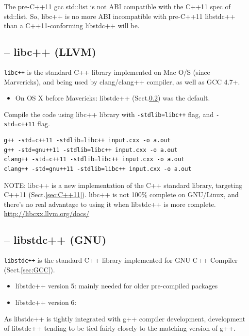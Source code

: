 The pre-C++11 gcc std::list is not ABI compatible with the C++11 spec of
std::list. So, libc++ is no more ABI incompatible
with pre-C++11 libstdc++ than a C++11-conforming libstdc++ will be.


\subsection{-- libc++ (LLVM)}
\label{sec:libc++}

\verb!libc++! is the standard C++ library implemented on Mac O/S (since
Marvericks), and being used by clang/clang++ compiler, as well as GCC 4.7+.
\begin{itemize}
  \item On OS X before Mavericks: libstdc++ (Sect.\ref{sec:libstdc++}) was the
  default.
\end{itemize}
Compile the code using libc++ library with \verb!-stdlib=libc++! flag, and 
\verb!-std=c++11! flag.

\begin{verbatim}
g++ -std=c++11 -stdlib=libc++ input.cxx -o a.out
g++ -std=gnu++11 -stdlib=libc++ input.cxx -o a.out
clang++ -std=c++11 -stdlib=libc++ input.cxx -o a.out
clang++ -std=gnu++11 -stdlib=libc++ input.cxx -o a.out
\end{verbatim}

NOTE: libc++ is a new implementation of the C++ standard library, targeting C++11
(Sect.\ref{sec:C++11}). libc++ is not 100\% complete on GNU/Linux, and there's
no real advantage to using it when libstdc++ is more complete.
\url{http://libcxx.llvm.org/docs/}



\subsection{-- libstdc++ (GNU)}
\label{sec:libstdc++}

\verb!libstdc++! is the standard C++ library implemented for GNU C++ Compiler
(Sect.\ref{sec:GCC}).
\begin{itemize}
  \item libstdc++ version 5: mainly needed for older pre-compiled packages
  
  \item libstdc++ version 6:
\end{itemize}
As libstdc++ is tightly integrated with g++ compiler development,
development of libstdc++ tending to be tied fairly closely to the matching
version of g++.

